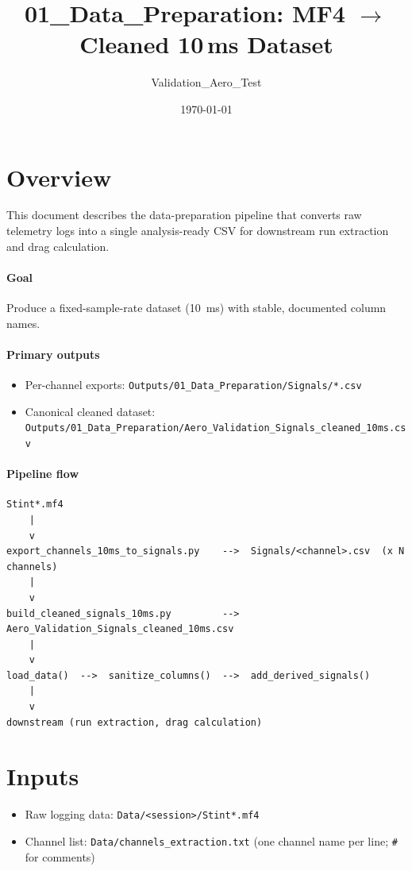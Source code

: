 \documentclass[11pt,a4paper]{article}
\title{01\_Data\_Preparation: MF4 $\rightarrow$ Cleaned 10\,ms Dataset}
\author{Validation\_Aero\_Test}
\date{\today}
\begin{document}
\maketitle

\section{Overview}
This document describes the data-preparation pipeline that converts raw telemetry
logs into a single analysis-ready CSV for downstream run extraction and drag
calculation.

\paragraph{Goal}
Produce a fixed-sample-rate dataset (\SI{10}{ms}) with stable, documented column
names.

\paragraph{Primary outputs}
\begin{itemize}
  \item Per-channel exports: \texttt{Outputs/01\_Data\_Preparation/Signals/*.csv}
  \item Canonical cleaned dataset: \texttt{Outputs/01\_Data\_Preparation/Aero\_Validation\_Signals\_cleaned\_10ms.csv}
\end{itemize}

\paragraph{Pipeline flow}
\begin{center}
\begin{verbatim}
Stint*.mf4
    |
    v
export_channels_10ms_to_signals.py    -->  Signals/<channel>.csv  (x N channels)
    |
    v
build_cleaned_signals_10ms.py         -->  Aero_Validation_Signals_cleaned_10ms.csv
    |
    v
load_data()  -->  sanitize_columns()  -->  add_derived_signals()
    |
    v
downstream (run extraction, drag calculation)
\end{verbatim}
\end{center}

\section{Inputs}
\begin{itemize}
  \item Raw logging data: \texttt{Data/<session>/Stint*.mf4}
  \item Channel list: \texttt{Data/channels\_extraction.txt} (one channel name per
        line; \texttt{\#} for comments)
\end{itemize}
\end{document}
